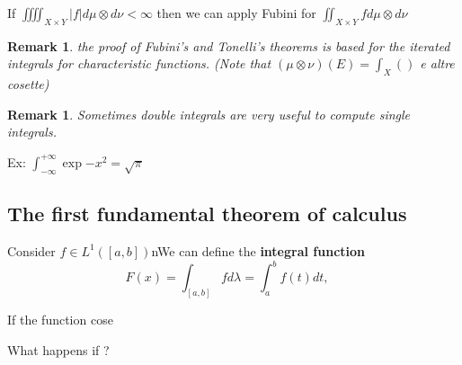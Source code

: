 \documentclass[a4paper,12pt]{article}
\theoremstyle{break}
\newtheorem{remark}[section]{Remark}
\numberwithin{equation}{section}
\begin{document}
If \(\iiiint_{X \times Y} \vert f \vert d\mu \otimes d\nu < \infty\) then we can apply Fubini for \(\iint_{X \times Y} f d\mu \otimes d\nu\)
\begin{remark}
    the proof of Fubini's and Tonelli's theorems is based for the iterated integrals for characteristic functions.
    (Note that \((\mu \otimes \nu)(E) = \int_X ()\) e altre cosette)
\end{remark}
\begin{remark}
    Sometimes double integrals are very useful to compute single integrals.
\end{remark}
Ex: \(\int_{-\infty}^{+\infty}\exp{-x^2} = \sqrt{\pi}\)


\subsection*{The first fundamental theorem of calculus}

Consider \(f \in L^1\left([a,b]\right)\)nWe can define the \textbf{integral function}
\[F(x) = \int_{[a,b]} f d\lambda = \int_a^b f(t)dt , \quad \]

If the function cose 

What happens if ?
\end{document}
